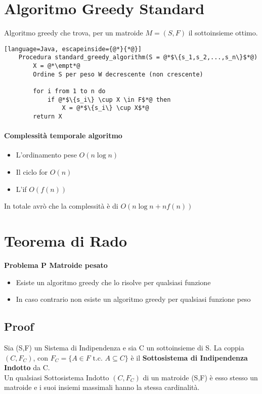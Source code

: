 \section{Algoritmo Greedy Standard}
\ra Algoritmo greedy che trova, per un matroide $M=(S,F)$ il sottoinsieme ottimo.
\begin{lstlisting}[language=Java, escapeinside={@*}{*@}]
    Procedura standard_greedy_algorithm(S = @*$\{s_1,s_2,...,s_n\}$*@)
        X = @*\empt*@
        Ordine S per peso W decrescente (non crescente)

        for i from 1 to n do
            if @*$\{s_i\} \cup X \in F$*@ then
                X = @*$\{s_i\} \cup X$*@
        return X
\end{lstlisting}
\paragraph*{Complessità temporale algoritmo}
\begin{itemize}
    \item L'ordinamento pese $O(n \log n)$
    \item Il ciclo for $O(n)$
    \item L'if $O(f(n))$
\end{itemize}
In totale avrò che la complessità è di $O(n\log n + n f(n))$

\section{Teorema di Rado}
\textbf{Problema P \ra Matroide pesato}
\begin{itemize}
    \item Esiste un algoritmo greedy che lo risolve per qualsiasi funzione
    \item In caso contrario \ra non esiste un algoritmo greedy per qualsiasi funzione peso
\end{itemize}
\subsection{Proof}
Sia (S,F) un Sistema di Indipendenza e sia C un sottoinsieme di S. La coppia $(C,F_C)$,
con $F_C=\{A \in F \text{ t.c. } A \subseteq C \}$ è il \textbf{Sottosistema di Indipendenza Indotto}
da C.\\
Un qualsiasi Sottosistema Indotto $(C, F_C)$ di un matroide (S,F) è esso stesso un
matroide e i suoi insiemi massimali hanno la stessa cardinalità.
